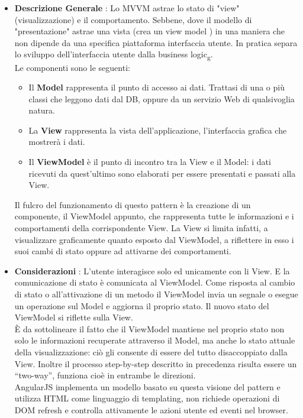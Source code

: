 {{{			\begin{itemize}\itemsep1pt
				\item \textbf{Descrizione Generale} : Lo MVVM astrae lo stato di "view" (visualizzazione) e il comportamento. Sebbene, dove il modello di "presentazione" astrae una vista (crea un view model ) in una maniera che non dipende da una specifica piattaforma interfaccia utente. In pratica separa lo sviluppo dell'interfaccia utente dalla business logic\textsubscript{g}.\\
				Le componenti sono le seguenti:
				\begin{itemize}
					\item Il \textbf{Model} rappresenta il punto di accesso ai dati. Trattasi di una o più classi che leggono dati dal DB, oppure da un servizio Web di qualsivoglia natura.
					\item La \textbf{View} rappresenta la vista dell'applicazione, l'interfaccia grafica che mostrerà i dati.
					\item Il \textbf{ViewModel} è il punto di incontro tra la View e il Model: i dati ricevuti da quest’ultimo sono elaborati per essere presentati e passati alla View.
				\end{itemize}
				Il fulcro del funzionamento di questo pattern è la creazione di un componente, il ViewModel appunto, che rappresenta tutte le informazioni e i comportamenti della corrispondente View. La View si limita infatti, a visualizzare graficamente quanto esposto dal ViewModel, a riflettere in esso i suoi cambi di stato oppure ad attivarne dei comportamenti.
				\item \textbf{Considerazioni} : L'utente interagisce solo ed unicamente con li View. E la comunicazione di stato è comunicata al ViewModel. Come risposta al cambio di stato o all'attivazione di un metodo il ViewModel invia un segnale o esegue un operazione sul Model e aggiorna il proprio stato. Il nuovo stato del ViewModel si riflette sulla View.\\
				È da sottolineare il fatto che il ViewModel mantiene nel proprio stato non solo le informazioni recuperate attraverso il Model, ma anche lo stato attuale della visualizzazione: ciò gli consente di essere del tutto disaccoppiato dalla View. Inoltre il processo step-by-step descritto in precedenza risulta essere un “two-way”, funziona cioè in entrambe le direzioni.\\
				AngularJS implementa un modello basato su questa visione del pattern e utilizza HTML come linguaggio di templating, non richiede operazioni di DOM refresh e controlla attivamente le azioni utente ed eventi nel browser. 

\end{itemize}}}}
